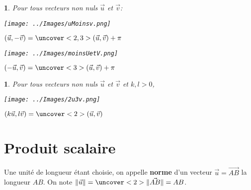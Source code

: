 \documentclass{beamer}
\newtheorem{proposition}[theorem]{\translate{Proposition}}
\theoremstyle{plain}
\begin{document}
\begin{frame}

\begin{proposition}
 Pour tous vecteurs non nuls $\vec{u}$ et $\vec{v}$:
 \begin{multicols}{2}
  
  \begin{center}
    \texttt{[image: ../Images/uMoinsv.png]}
    
    $(\vec{u},-\vec{v})=\uncover<2,3>{(\vec{u},\vec{v})+\pi}$
  \end{center}

  
  \columnbreak 

    \begin{center}
    \texttt{[image: ../Images/moinsUetV.png]}
    
    $(-\vec{u},\vec{v})=\uncover<3>{(\vec{u},\vec{v})+\pi}$
  \end{center}
  
  \end{multicols}
\end{proposition}

\end{frame}

\begin{frame}

\begin{proposition}
Pour tous vecteurs non nuls $\vec{u}$ et $\vec{v}$
et $k,l>0$, 
 \begin{center}
    \texttt{[image: ../Images/2u3v.png]}
    
    $(k\vec{u},l\vec{v})=\uncover<2>{(\vec{u},\vec{v})}$
  \end{center}
\end{proposition}


 \end{frame}
 
  \section{Produit scalaire}
 
 
 \begin{frame}
 \begin{definition}
  Une unité de longueur étant choisie, on appelle \textbf{norme} d'un vecteur $\vec{u}=\vec{AB}$
  la longueur $AB$. On note $\|\vec{u}\|=\uncover<2>{\|\vec{AB}\|}=AB$.
 \end{definition}
\end{frame}
\end{document}
